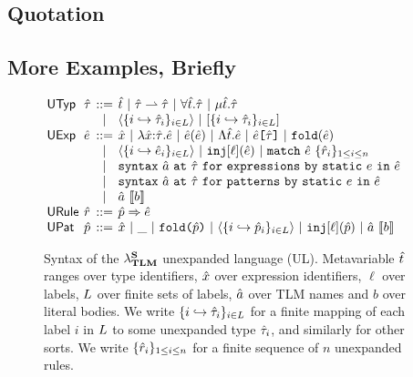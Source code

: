 \documentclass[acmsmall,review,anonymous]{acmart}\settopmatter{printfolios=true,printccs=false,printacmref=false}
\begin{document}
\subsection{Quotation}

\subsection{More Examples, Briefly}
% 

\begin{figure}[t!]
\begin{minipage}{\textwidth}
\small
$\arraycolsep=2pt\begin{array}{llcl}
\mathsf{UTyp} & \utau & ::= & 
\ut ~\vert~ 
\parr{\utau}{\utau} ~\vert~
\forallt{\ut}{\utau} ~\vert~
\rect{\ut}{\utau}\\
& & \vert & 
\prodt{\mapschema{\utau}{i}{\labelset}} ~\vert~
\sumt{\mapschema{\utau}{i}{\labelset}}\\
\mathsf{UExp} & \ue & ::= & 
\ux ~\vert~
\lam{\ux}{\utau}{\ue} ~\vert~
\ap{\ue}{\ue} ~\vert~
\Lam{\ut}{\ue} ~\vert~
\App{\ue}{\utau} ~\vert~
\fold{\ue} \\
&& \vert & \tpl{\mapschema{\ue}{i}{\labelset}} ~\vert~
\inj{\ell}{\ue} ~\vert~
\matchwith{\ue}{\seqschemaX{\urv}}
 \\
& & \vert & \uesyntaxq{\tsmv}{\utau}{e}{\ue} \\   
& & \vert & \usyntaxup{\tsmv}{\utau}{e}{\ue} \\
&&\vert&  \utsmap{\tsmv}{b} \\
\mathsf{URule} & \urv & ::= & 
\matchrule{\upv}{\ue} \\
\mathsf{UPat} & \upv & ::= & 
\ux ~\vert~
\wildp ~\vert~ 
\foldp{\upv} ~\vert~
\tplp{\mapschema{\upv}{i}{\labelset}} ~\vert~
\injp{\ell}{\upv} ~\vert~
\utsmap{\tsmv}{b}

\end{array}$
\end{minipage}
\caption[Syntax of the $\miniVersePat$ unexpanded language (UL)]{Syntax of the $\miniVersePat$ unexpanded language (UL). Metavariable $\ut$ ranges over type identifiers, $\ux$ over expression identifiers, $\ell$ over labels, $\labelset$ over finite sets of labels, $\tsmv$ over TLM names and $b$ over literal bodies. We write $\mapschema{\utau}{i}{\labelset}$ for a finite mapping of each label $i$ in $\labelset$ to some unexpanded type $\utau_i$, and similarly for other sorts. We write $\seqschemaX{\urv}$ for a finite sequence of $n$ unexpanded rules.
}
\label{fig:U-unexpanded-terms}
\end{figure}
\end{document}
